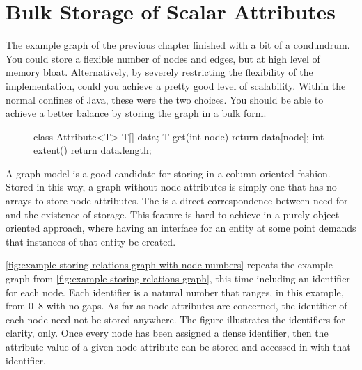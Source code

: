 \section{Bulk Storage of Scalar Attributes}
 
The example graph of the previous chapter finished with a bit of a condundrum.
You could store a flexible number of nodes and edges, but at high level of
memory bloat. Alternatively, by severely restricting the flexibility of the
implementation, could you achieve a pretty good level of scalability. Within the
normal confines of Java, these were the two choices. You should be able to
achieve a better balance by storing the graph in a bulk form.

\begin{figure}
\vspace{-2mm}
\begin{framedlisting}
class Attribute<T> {
  T[] data;
  T get(int node) {
     return data[node];
  }
  int extent() {
    return data.length;
  }
}
\end{framedlisting}
\end{figure}
A graph model is a good candidate for storing in a column-oriented fashion.
Stored in this way, a graph without node attributes is simply one that has no
arrays to store node attributes. The is a direct correspondence between need for
and the existence of storage. This feature is hard to achieve in a purely
object-oriented approach, where having an interface for an entity at some point
demands that instances of that entity be created.

\autoref{fig:example-storing-relations-graph-with-node-numbers} repeats the
example graph from \autoref{fig:example-storing-relations-graph}, this time
including an identifier for each node. Each identifier is a natural number that
ranges, in this example, from 0--8 with no gaps. As far as node attributes are
concerned, the identifier of each node need not be stored anywhere. The figure
illustrates the identifiers for clarity, only. Once every node has been assigned
a dense identifier, then the attribute value of a given node attribute can be
stored and accessed in with that identifier.

